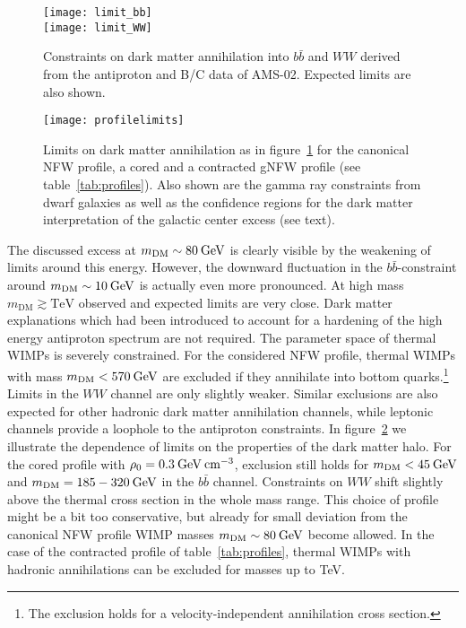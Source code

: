 \documentclass[a4paper,11pt]{article}
\newcommand{\eVdist}{\kern-0.06em}
\newcommand{\gev}{\:\text{Ge\eVdist V}}
\newcommand{\cm}{\:\text{cm}}
\begin{document}
\begin{figure}[htp]
\begin{center}
  \texttt{[image: limit\_bb]}\\[3mm]
   \texttt{[image: limit\_WW]}
\end{center}
\caption{Constraints on dark matter annihilation into $b\bar{b}$ and $WW$ derived from the antiproton and B/C data of AMS-02. Expected limits are also shown.}
\label{fig:dmlimits}
\end{figure}

\begin{figure}[htp]
\begin{center}
  \texttt{[image: profilelimits]}
\end{center}
\caption{Limits on dark matter annihilation as in figure~\ref{fig:dmlimits} for the canonical NFW profile, a cored and a contracted gNFW profile (see table~\ref{tab:profiles}). Also shown are the gamma ray constraints from dwarf galaxies as well as the confidence regions for the dark matter interpretation of the galactic center excess (see text).}
\label{fig:dmlimits2}
\end{figure}

The discussed excess at $m_{\text{DM}}\sim 80\gev$ is clearly visible by the weakening of limits around this energy. However, the downward fluctuation in the $b\bar{b}$-constraint around $m_{\text{DM}}\sim 10\gev$ is actually even more pronounced. At high mass $m_{\text{DM}}\gtrsim\text{TeV}$ observed and expected limits are very close. Dark matter explanations which had been introduced to account for a hardening of the high energy antiproton spectrum are not required. The parameter space of thermal WIMPs is severely constrained. For the considered NFW profile, thermal WIMPs with mass $m_{\text{DM}}<570\gev$ are excluded if they annihilate into bottom quarks.\footnote{The exclusion holds for a velocity-independent annihilation cross section.} Limits in the $WW$ channel are only slightly weaker. Similar exclusions are also expected for other hadronic dark matter annihilation channels, while leptonic channels provide a loophole to the antiproton constraints. In figure~\ref{fig:dmlimits2} we illustrate the dependence of limits on the properties of the dark matter halo. For the cored profile with $\rho_0 = 0.3\gev\cm^{-3}$, exclusion still holds for $m_{\text{DM}}<45\gev$ and $m_{\text{DM}}=185-320\gev$ in the $b\bar{b}$ channel. Constraints on $WW$ shift slightly above the thermal cross section in the whole mass range. This choice of profile might be a bit too conservative, but already for small deviation from the canonical NFW profile WIMP masses $m_{\text{DM}}\sim 80\gev$ become allowed. In the case of the contracted profile of table~\ref{tab:profiles}, thermal WIMPs with hadronic annihilations can be excluded for masses up to TeV.
\end{document}
